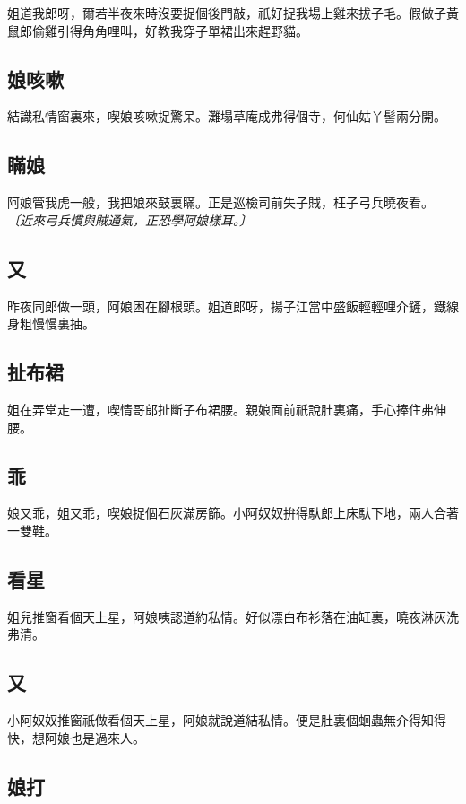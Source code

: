 姐道我郎呀，爾若半夜來時沒要捉個後門敲，祇好捉我場上雞來拔子毛。假做子黃鼠郎偷雞引得角角哩叫，好教我穿子單裙出來趕野貓。

\subsection*{娘咳嗽}

結識私情窗裏來，喫娘咳嗽捉驚呆。灘塌草庵成弗得個寺，何仙姑丫髻兩分開。

\subsection*{瞞娘}

阿娘管我虎一般，我把娘來鼓裏瞞。正是巡檢司前失子賊，枉子弓兵曉夜看。
\textit{〔近來弓兵慣與賊通氣，正恐學阿娘樣耳。〕}

\subsection*{又}

昨夜同郎做一頭，阿娘困在腳根頭。姐道郎呀，揚子江當中盛飯輕輕哩介鏟，鐵線身粗慢慢裏抽。

\subsection*{扯布裙}

姐在弄堂走一遭，喫情哥郎扯斷子布裙腰。親娘面前祇說肚裏痛，手心捧住弗伸腰。

\subsection*{乖}

娘又乖，姐又乖，喫娘捉個石灰滿房篩。小阿奴奴拚得馱郎上床馱下地，兩人合著一雙鞋。

\subsection*{看星}

姐兒推窗看個天上星，阿娘咦認道約私情。好似漂白布衫落在油缸裏，曉夜淋灰洗弗清。

\subsection*{又}

小阿奴奴推窗祇做看個天上星，阿娘就說道結私情。便是肚裏個蛔蟲無介得知得快，想阿娘也是過來人。

\subsection*{娘打}

